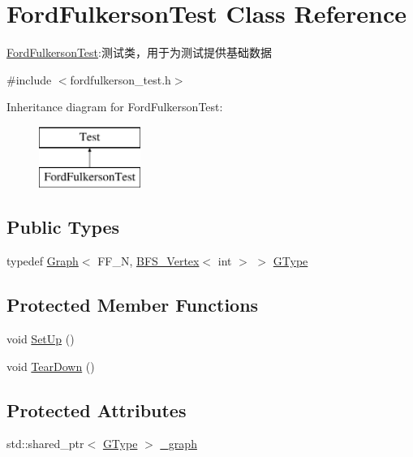 \hypertarget{class_ford_fulkerson_test}{}\section{Ford\+Fulkerson\+Test Class Reference}
\label{class_ford_fulkerson_test}


\hyperlink{class_ford_fulkerson_test}{Ford\+Fulkerson\+Test}\+:测试类，用于为测试提供基础数据  




{\ttfamily \#include $<$fordfulkerson\+\_\+test.\+h$>$}

Inheritance diagram for Ford\+Fulkerson\+Test\+:\begin{figure}[H]
\begin{center}
\leavevmode
\includegraphics[height=2.000000cm]{class_ford_fulkerson_test}
\end{center}
\end{figure}
\subsection*{Public Types}
\begin{DoxyCompactItemize}
\item 
typedef \hyperlink{struct_introduction_to_algorithm_1_1_graph_algorithm_1_1_graph}{Graph}$<$ F\+F\+\_\+\+N, \hyperlink{struct_introduction_to_algorithm_1_1_graph_algorithm_1_1_b_f_s___vertex}{B\+F\+S\+\_\+\+Vertex}$<$ int $>$ $>$ \hyperlink{class_ford_fulkerson_test_a58e2f6af86c26eced9f7b316c5fa5d88}{G\+Type}
\end{DoxyCompactItemize}
\subsection*{Protected Member Functions}
\begin{DoxyCompactItemize}
\item 
void \hyperlink{class_ford_fulkerson_test_af70f0b88d1d16cd50c76df0f98f706b0}{Set\+Up} ()
\item 
void \hyperlink{class_ford_fulkerson_test_afcbc3160890661b9ae6d18a3a15bf6a6}{Tear\+Down} ()
\end{DoxyCompactItemize}
\subsection*{Protected Attributes}
\begin{DoxyCompactItemize}
\item 
std\+::shared\+\_\+ptr$<$ \hyperlink{class_ford_fulkerson_test_a58e2f6af86c26eced9f7b316c5fa5d88}{G\+Type} $>$ \hyperlink{class_ford_fulkerson_test_a4c5c58e3ebc1d2d324c67a8a9afe19e3}{\+\_\+graph}
\end{DoxyCompactItemize}


